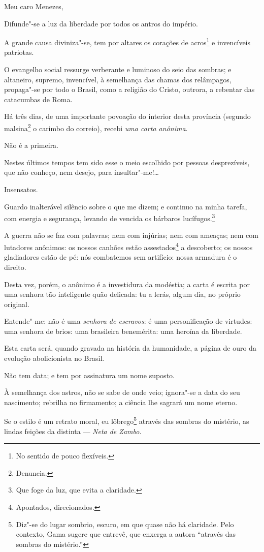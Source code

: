 \noindent{}Meu caro Menezes,\smallskip

Difunde"-se a luz da liberdade por todos os antros do império.

A grande causa diviniza"-se, tem por altares os corações de
acros\footnote{No sentido de pouco flexíveis.} e invencíveis
patriotas.

O evangelho social ressurge verberante e luminoso do seio das sombras; e
altaneiro, supremo, invencível, à semelhança das chamas dos relâmpagos,
propaga"-se por todo o Brasil, como a religião do Cristo, outrora, a
rebentar das catacumbas de Roma.

Há três dias, de uma importante povoação do interior desta província
(segundo malsina\footnote{Denuncia.} o carimbo do correio), recebi
\emph{uma carta anônima}.

Não é a primeira.

Nestes últimos tempos tem sido esse o meio escolhido por pessoas
desprezíveis, que não conheço, nem desejo, para insultar"-me!\ldots{}

Insensatos.

Guardo inalterável silêncio sobre o que me dizem; e continuo na minha
tarefa, com energia e segurança, levando de vencida os bárbaros
lucífugos.\footnote{Que foge da luz, que evita a claridade.}

A guerra não se faz com palavras; nem com injúrias; nem com ameaças; nem
com lutadores anônimos: os nossos canhões estão assestados\footnote{
  Apontados, direcionados.} a descoberto; os nossos gladiadores estão de
pé: nós combatemos sem artifício: nossa armadura é o direito.

Desta vez, porém, o anônimo é a investidura da modéstia; a carta é
escrita por uma senhora tão inteligente quão delicada: tu a lerás, algum
dia, no próprio original.

Entende"-me: não é uma \emph{senhora de escravos}: é uma personificação
de virtudes: uma senhora de brios: uma brasileira benemérita: uma
heroína da liberdade.

Esta carta será, quando gravada na história da humanidade, a página de
ouro da evolução abolicionista no Brasil.

Não tem data; e tem por assinatura um nome suposto.

À semelhança dos astros, não se sabe de onde veio; ignora"-se a data do
seu nascimento; rebrilha no firmamento; a ciência lhe sagrará um nome
eterno.

Se o estilo é um retrato moral, eu lôbrego\footnote{Diz"-se do lugar
  sombrio, escuro, em que quase não há claridade. Pelo contexto, Gama
  sugere que entrevê, que enxerga a autora ``através das sombras do
  mistério.''} através das sombras do mistério, as lindas feições da
distinta --- \emph{Neta de Zambo}.

